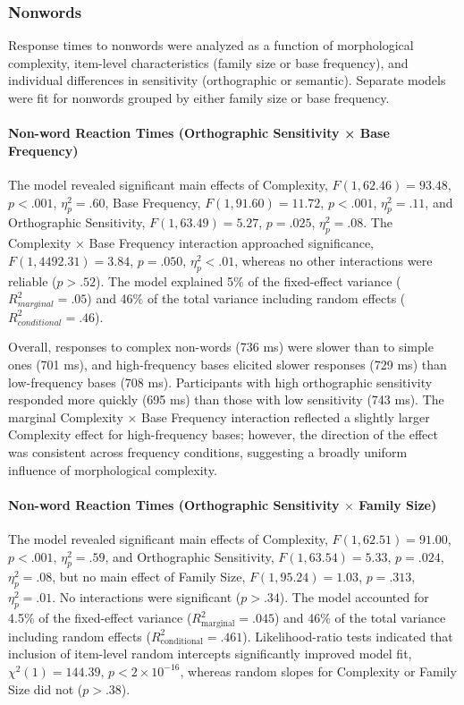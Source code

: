 \documentclass[preprint,12pt, authoryear, review]{elsarticle}
\begin{document}
	\subsubsection{Nonwords}
	
		Response times to nonwords were analyzed as a function of morphological complexity, item-level characteristics (family size or base frequency), and individual differences in sensitivity (orthographic or semantic). Separate models were fit for nonwords grouped by either family size or base frequency.
	
		\paragraph{Non-word Reaction Times (Orthographic Sensitivity × Base Frequency)}
	
		The model revealed significant main effects of Complexity, $F(1,62.46)=93.48$, $p<.001$, $\eta^2_p=.60$, Base Frequency, $F(1,91.60)=11.72$, $p<.001$, $\eta^2_p=.11$, and Orthographic Sensitivity, $F(1,63.49)=5.27$, $p=.025$, $\eta^2_p=.08$. The Complexity × Base Frequency interaction approached significance, $F(1,4492.31)=3.84$, $p=.050$, $\eta^2_p<.01$, whereas no other interactions were reliable ($p>.52$). The model explained 5\% of the fixed-effect variance ($R^2_{marginal}=.05$) and 46\% of the total variance including random effects ($R^2_{conditional}=.46$).
	
		Overall, responses to complex non-words (736 ms) were slower than to simple ones (701 ms), and high-frequency bases elicited slower responses (729 ms) than low-frequency bases (708 ms). Participants with high orthographic sensitivity responded more quickly (695 ms) than those with low sensitivity (743 ms). The marginal Complexity × Base Frequency interaction  reflected a slightly larger Complexity effect for high-frequency bases; however, the direction of the effect was consistent across frequency conditions, suggesting a broadly uniform influence of morphological complexity.


		\paragraph{Non-word Reaction Times (Orthographic Sensitivity $\times$ Family Size)}
	
		The model revealed significant main effects of Complexity, $F(1, 62.51) = 91.00$, $p < .001$, $\eta^2_p = .59$, and Orthographic Sensitivity, $F(1, 63.54) = 5.33$, $p = .024$, $\eta^2_p = .08$, but no main effect of Family Size, $F(1, 95.24) = 1.03$, $p = .313$, $\eta^2_p = .01$. No interactions were significant ($p > .34$). The model accounted for 4.5\% of the fixed-effect variance ($R^2_{\text{marginal}} = .045$) and 46\% of the total variance including random effects ($R^2_{\text{conditional}} = .461$). Likelihood-ratio tests indicated that inclusion of item-level random intercepts significantly improved model fit, $\chi^2(1) = 144.39$, $p < 2 \times 10^{-16}$, whereas random slopes for Complexity or Family Size did not ($p > .38$).
	
\end{document}
